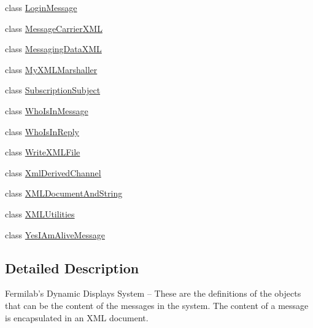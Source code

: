 \begin{DoxyCompactItemize}
class \hyperlink{classgov_1_1fnal_1_1ppd_1_1dd_1_1xml_1_1LoginMessage}{Login\-Message}
\item 
class \hyperlink{classgov_1_1fnal_1_1ppd_1_1dd_1_1xml_1_1MessageCarrierXML}{Message\-Carrier\-X\-M\-L}
\item 
class \hyperlink{classgov_1_1fnal_1_1ppd_1_1dd_1_1xml_1_1MessagingDataXML}{Messaging\-Data\-X\-M\-L}
\item 
class \hyperlink{classgov_1_1fnal_1_1ppd_1_1dd_1_1xml_1_1MyXMLMarshaller}{My\-X\-M\-L\-Marshaller}
\item 
class \hyperlink{classgov_1_1fnal_1_1ppd_1_1dd_1_1xml_1_1SubscriptionSubject}{Subscription\-Subject}
\item 
class \hyperlink{classgov_1_1fnal_1_1ppd_1_1dd_1_1xml_1_1WhoIsInMessage}{Who\-Is\-In\-Message}
\item 
class \hyperlink{classgov_1_1fnal_1_1ppd_1_1dd_1_1xml_1_1WhoIsInReply}{Who\-Is\-In\-Reply}
\item 
class \hyperlink{classgov_1_1fnal_1_1ppd_1_1dd_1_1xml_1_1WriteXMLFile}{Write\-X\-M\-L\-File}
\item 
class \hyperlink{classgov_1_1fnal_1_1ppd_1_1dd_1_1xml_1_1XmlDerivedChannel}{Xml\-Derived\-Channel}
\item 
class \hyperlink{classgov_1_1fnal_1_1ppd_1_1dd_1_1xml_1_1XMLDocumentAndString}{X\-M\-L\-Document\-And\-String}
\item 
class \hyperlink{classgov_1_1fnal_1_1ppd_1_1dd_1_1xml_1_1XMLUtilities}{X\-M\-L\-Utilities}
\item 
class \hyperlink{classgov_1_1fnal_1_1ppd_1_1dd_1_1xml_1_1YesIAmAliveMessage}{Yes\-I\-Am\-Alive\-Message}
\end{DoxyCompactItemize}


\subsection{Detailed Description}
Fermilab's Dynamic Displays System -- These are the definitions of the objects that can be the content of the messages in the system. The content of a message is encapsulated in an X\-M\-L document.